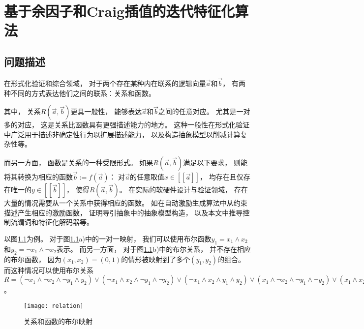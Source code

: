 \chapter{基于余因子和Craig插值的迭代特征化算法}
\label{chap:2}



\section{问题描述}

在形式化验证和综合领域，
对于两个存在某种内在联系的逻辑向量$\vec{a}$和$\vec{b}$，
有两种不同的方式表达他们之间的联系：关系和函数。

其中，
关系$R(\vec{a},\vec{b})$更具一般性，
能够表达$\vec{a}$和$\vec{b}$之间的任意对应。
尤其是一对多的对应，
这是关系比函数具有更强描述能力的地方。
这种一般性在形式化验证中广泛用于描述非确定性行为以扩展描述能力，
以及构造抽象模型以削减计算复杂性等。

而另一方面，
函数是关系的一种受限形式。
如果$R(\vec{a},\vec{b})$满足以下要求，
则能将其转换为相应的函数$\vec{b}:=f(\vec{a})$：
对$\vec{a}$的任意取值$x\in[\![\vec{a}]\!]$，
均存在且仅存在唯一的$y\in[\![\vec{b}]\!]$，
使得$R(\vec{a},\vec{b})$。
在实际的软硬件设计与验证领域，
存在大量的情况需要从一个关系中获得相应的函数。
如在自动激励生成算法中从约束描述产生相应的激励函数，
证明导引抽象中的抽象模型构造，
以及本文中推导控制流谓词和特征化解码器等。

以图\ref{fig_relation}为例。
对于图\ref{fig_relation}a)中的一对一映射，
我们可以使用布尔函数$y_1=x_1\wedge x_2$和$y_2=\neg x_1\wedge \neg x_2$表示。
而另一方面，
对于图\ref{fig_relation}b)中的布尔关系，
并不存在相应的布尔函数，
因为$(x_1,x_2)=(0,1)$的情形被映射到了多个$(y_1,y_2)$的组合。
而这种情况可以使用布尔关系$R=(\neg x_1\wedge\neg x_2\wedge \neg y_1\wedge y_2)
\vee(\neg x_1\wedge x_2\wedge \neg y_1\wedge \neg y_2)
\vee(\neg x_1\wedge x_2\wedge y_1\wedge y_2)
\vee(x_1\wedge \neg x_2\wedge \neg y_1 \wedge \neg y_2)
\vee(x_1\wedge x_2\wedge y_1\wedge \neg y_2)$。

\begin{figure}[t]
\begin{center}
\texttt{[image: relation]}
\end{center}
\caption{关系和函数的布尔映射}
  \label{fig_relation}
\end{figure}



